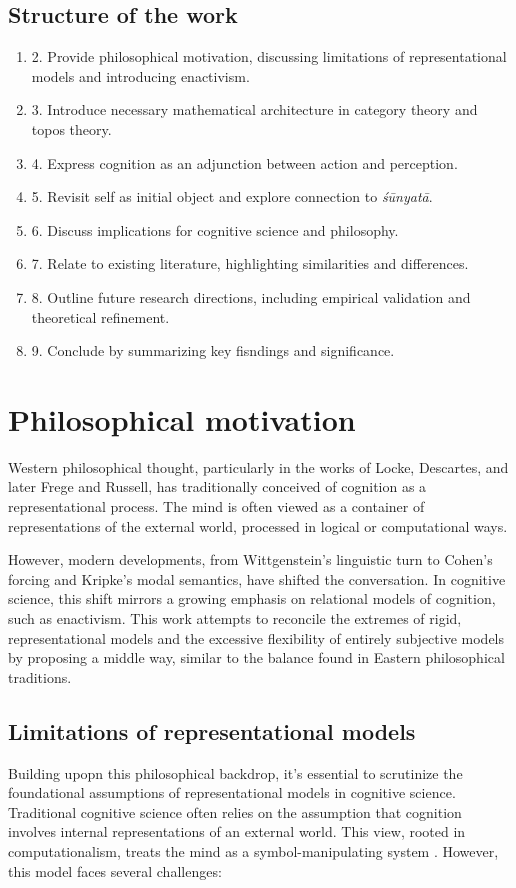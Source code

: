 \documentclass{article}
\begin{document}
\subsection{Structure of the work}
\begin{enumerate}[start=2,label=\S]
    \item 2. Provide philosophical motivation, discussing limitations of representational models and introducing enactivism.
    \item 3. Introduce necessary mathematical architecture in category theory and topos theory.
    \item 4. Express cognition as an adjunction between action and perception.
    \item 5. Revisit self as initial object and explore connection to \emph{śūnyatā}.
    \item 6. Discuss implications for cognitive science and philosophy.
    \item 7. Relate to existing literature, highlighting similarities and differences.
    \item 8. Outline future research directions, including empirical validation and theoretical refinement.
    \item 9. Conclude by summarizing key fisndings and significance.
\end{enumerate}

\section{Philosophical motivation}
Western philosophical thought, particularly in the works of Locke, Descartes, and later Frege and Russell, has traditionally conceived of cognition as a representational process. The mind is often viewed as a container of representations of the external world, processed in logical or computational ways.

However, modern developments, from Wittgenstein’s linguistic turn to Cohen’s forcing and Kripke’s modal semantics, have shifted the conversation. In cognitive science, this shift mirrors a growing emphasis on relational models of cognition, such as enactivism. This work attempts to reconcile the extremes of rigid, representational models and the excessive flexibility of entirely subjective models by proposing a middle way, similar to the balance found in Eastern philosophical traditions.

\subsection{Limitations of representational models}
Building upopn this philosophical backdrop, it's essential to scrutinize the foundational assumptions of representational models in cognitive science. Traditional cognitive science often relies on the assumption that cognition involves internal representations of an external world. This view, rooted in computationalism, treats the mind as a symbol-manipulating system \cite{fodor1980}. However, this model faces several challenges:
\end{document}
